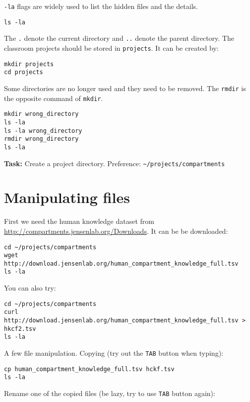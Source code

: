 \documentclass{article}\usepackage[]{graphicx}\usepackage[usenames,dvipsnames]{color}
\begin{document}
\verb+-la+ flags are widely used to list the hidden files and the details. 

\begin{verbatim}
ls -la
\end{verbatim}

The \verb+.+ denote the current directory and \verb+..+ denote the parent directory. The classroom projects should be stored in \verb+projects+. It can be created by:

\begin{verbatim}
mkdir projects
cd projects
\end{verbatim}

Some directories are no longer used and they need to be removed. The \verb+rmdir+ is the opposite command of \verb+mkdir+.

\begin{verbatim}
mkdir wrong_directory
ls -la
ls -la wrong_directory
rmdir wrong_directory
ls -la
\end{verbatim}

\textbf{Task:} Create a project directory. Preference: \verb+~/projects/compartments+

\section{Manipulating files}

First we need the human knowledge dataset from \href{http://compartments.jensenlab.org/Downloads}{http://compartments.jensenlab.org/Downloads}. It can be be downloaded:

\begin{verbatim}
cd ~/projects/compartments
wget http://download.jensenlab.org/human_compartment_knowledge_full.tsv
ls -la
\end{verbatim}

You can also try:
\begin{verbatim}
cd ~/projects/compartments
curl http://download.jensenlab.org/human_compartment_knowledge_full.tsv > hkcf2.tsv
ls -la
\end{verbatim}

A few file manipulation. Copying (try out the \verb+TAB+ button when typing):

\begin{verbatim}
cp human_compartment_knowledge_full.tsv hckf.tsv
ls -la
\end{verbatim}

Rename one of the copied files (be lazy, try to use \verb+TAB+ button again):
\end{document}
